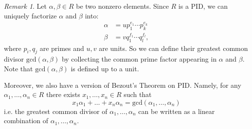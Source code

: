 \documentclass[11pt,openany]{book}
\theoremstyle{plain}
\theoremstyle{definition}
\theoremstyle{remark}
\newtheorem{remark}[remark]{Remark}
\begin{document}
\begin{remark} \label{rmk-bezout}
    Let $\alpha, \beta \in R$ be two nonzero elements. Since $R$ is a PID, we can uniquely factorize $\alpha$ and $\beta$ into:
    \begin{align*}
        \alpha &= up_1^{e_1}\cdots p_k^{e_k}\\
        \beta &=vq_1^{f_1}\cdots q_l^{f_l},
    \end{align*}
    where $p_i,q_j$ are primes and $u,v$ are units. So we can define their greatest common divisor $\mathrm{gcd}(\alpha,\beta)$ by collecting the common prime factor appearing in $\alpha$ and $\beta$. Note that $\mathrm{gcd}(\alpha,\beta)$ is defined up to a unit.

    Moreover, we also have a version of Bezout's Theorem on PID. Namely, for any $\alpha_1, \dots, \alpha_n \in R$ there exists $x_1, \dots, x_n \in R$ such that
         $$x_1\alpha_1 + \dots + x_n \alpha_n =\mathrm{gcd}(\alpha_1,\dots, \alpha_n)$$
        i.e. the greatest common divisor of $\alpha_1, \dots, \alpha_n$ can be written as a linear combination of $\alpha_1, \dots, \alpha_n$.
\end{remark}
\end{document}
